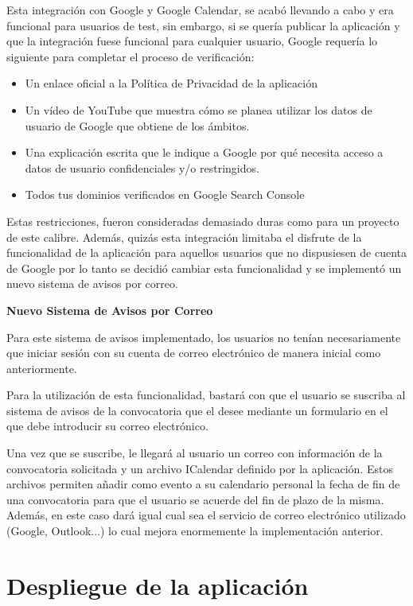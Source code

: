 Esta integración con Google y Google Calendar, se acabó llevando a cabo y era funcional para usuarios de test, sin embargo, si se quería publicar la aplicación y que la integración fuese funcional para cualquier usuario, Google requería lo siguiente para completar el proceso de verificación:

\begin{itemize}
    \item Un enlace oficial a la Política de Privacidad de la aplicación
    \item Un vídeo de YouTube que muestra cómo 
 se planea utilizar los datos de usuario de Google que obtiene de los ámbitos.
    \item Una explicación escrita que le indique a Google por qué necesita acceso a datos de usuario confidenciales y/o restringidos.
    \item Todos tus dominios verificados en Google Search Console
\end{itemize}

Estas restricciones, fueron consideradas demasiado duras como para un proyecto de este calibre. Además, quizás esta integración limitaba el disfrute de la funcionalidad de la aplicación para aquellos usuarios que no dispusiesen de cuenta de Google por lo tanto se decidió cambiar esta funcionalidad y se implementó un nuevo sistema de avisos por correo.

\textbf{Nuevo Sistema de Avisos por Correo}

Para este sistema de avisos implementado, los usuarios no tenían necesariamente que iniciar sesión con su cuenta de correo electrónico de manera inicial como anteriormente. 

Para la utilización de esta funcionalidad, bastará con que el usuario se suscriba al sistema de avisos de la convocatoria que el desee mediante un formulario en el que debe introducir su correo electrónico. 

Una vez que se suscribe, le llegará al usuario un correo con información de la convocatoria solicitada y un archivo ICalendar definido por la aplicación. Estos archivos permiten añadir como evento a su calendario personal la fecha de fin de una convocatoria para que el usuario se acuerde del fin de plazo de la misma. Además, en este caso dará igual cual sea el servicio de correo electrónico utilizado (Google, Outlook...) lo cual mejora enormemente la implementación anterior.

\section{Despliegue de la aplicación}

